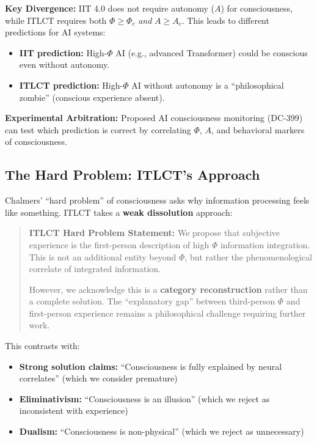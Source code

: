 \documentclass[12pt,a4paper]{article}
\begin{document}
\textbf{Key Divergence:} IIT 4.0 does not require autonomy ($A$) for consciousness, while ITLCT requires both $\Phi \geq \Phi_c$ \textit{and} $A \geq A_c$. This leads to different predictions for AI systems:
\begin{itemize}
\item \textbf{IIT prediction:} High-$\Phi$ AI (e.g., advanced Transformer) could be conscious even without autonomy.
\item \textbf{ITLCT prediction:} High-$\Phi$ AI without autonomy is a ``philosophical zombie'' (conscious experience absent).
\end{itemize}

\textbf{Experimental Arbitration:} Proposed AI consciousness monitoring (DC-399) can test which prediction is correct by correlating $\Phi$, $A$, and behavioral markers of consciousness.

\subsection{The Hard Problem: ITLCT's Approach}

Chalmers' ``hard problem'' of consciousness asks why information processing feels like something. ITLCT takes a \textbf{weak dissolution} approach:

\begin{quote}
\textbf{ITLCT Hard Problem Statement:} We propose that subjective experience is the first-person description of high $\Phi$ information integration. This is not an additional entity beyond $\Phi$, but rather the phenomenological correlate of integrated information.

However, we acknowledge this is a \textbf{category reconstruction} rather than a complete solution. The ``explanatory gap'' between third-person $\Phi$ and first-person experience remains a philosophical challenge requiring further work.
\end{quote}

This contrasts with:
\begin{itemize}
\item \textbf{Strong solution claims:} ``Consciousness is fully explained by neural correlates'' (which we consider premature)
\item \textbf{Eliminativism:} ``Consciousness is an illusion'' (which we reject as inconsistent with experience)
\item \textbf{Dualism:} ``Consciousness is non-physical'' (which we reject as unnecessary)
\end{itemize}
\end{document}
